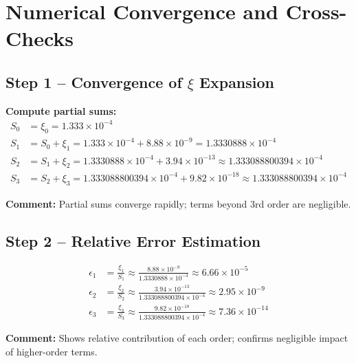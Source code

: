 \documentclass[12pt,a4paper]{article}
\begin{document}
\section{Numerical Convergence and Cross-Checks}

\subsection{Step 1 – Convergence of $\xi$ Expansion}

\textbf{Compute partial sums:}
\begin{align}
	S_0 &= \xi_0 = 1.333 \times 10^{-4} \\
	S_1 &= S_0 + \xi_1 = 1.333 \times 10^{-4} + 8.88 \times 10^{-9} = 1.3330888 \times 10^{-4} \\
	S_2 &= S_1 + \xi_2 = 1.3330888 \times 10^{-4} + 3.94 \times 10^{-13} \approx 1.333088800394 \times 10^{-4} \\
	S_3 &= S_2 + \xi_3 = 1.333088800394 \times 10^{-4} + 9.82 \times 10^{-18} \approx 1.333088800394 \times 10^{-4}
\end{align}

\textbf{Comment:} Partial sums converge rapidly; terms beyond 3rd order are negligible.

\subsection{Step 2 – Relative Error Estimation}

\begin{align}
	\epsilon_1 &= \frac{\xi_1}{S_1} \approx \frac{8.88 \times 10^{-9}}{1.3330888 \times 10^{-4}} \approx 6.66 \times 10^{-5} \\
	\epsilon_2 &= \frac{\xi_2}{S_2} \approx \frac{3.94 \times 10^{-13}}{1.333088800394 \times 10^{-4}} \approx 2.95 \times 10^{-9} \\
	\epsilon_3 &= \frac{\xi_3}{S_3} \approx \frac{9.82 \times 10^{-18}}{1.333088800394 \times 10^{-4}} \approx 7.36 \times 10^{-14}
\end{align}

\textbf{Comment:} Shows relative contribution of each order; confirms negligible impact of higher-order terms.

\end{document}
